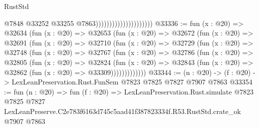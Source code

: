 \begin{lexlean}{RustStd}
\begin{coremodule}
                                              @7848
                                              @33252
                                              @33255
                                              @7863)))))))))))))))))))))
@33336 := fun (x : @20) =>
  @32634
    (fun (x : @20) =>
    @32653
      (fun (x : @20) =>
      @32672
        (fun (x : @20) =>
        @32691
          (fun (x : @20) =>
          @32710
            (fun (x : @20) =>
            @32729
              (fun (x : @20) =>
              @32748
                (fun (x : @20) =>
                @32767
                  (fun (x : @20) =>
                  @32786
                    (fun (x : @20) =>
                    @32805
                      (fun (x : @20) =>
                      @32824
                        (fun (x : @20) =>
                        @32843 (fun (x : @20) => @32862 (fun (x : @20) => @33309)))))))))))))
@33344 := (n : @20) -> (f : @20) -> LexLeanPreservation.Rust.FunSem @7823 @7825 @7827 @7907 @7863
@33354 := fun (n : @20) =>
  fun (f : @20) =>
  LexLeanPreservation.Rust.simulate
    @7823
    @7825
    @7827
    LexLeanPreserve.C2e783f6163d745c5aad41f387823334f.R53.RustStd.crate_ok
    @7907
    @7863
\end{coremodule}
\end{lexlean}
